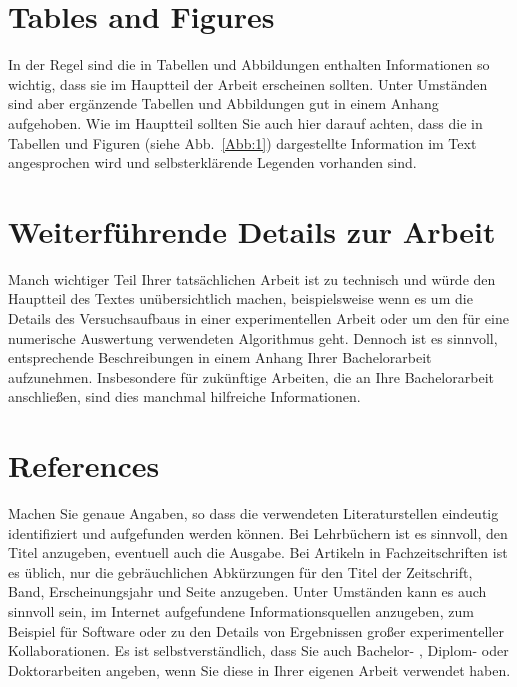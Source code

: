 \documentclass[a4paper,11pt,oneside,final,english,toc=bib]{scrbook}
\begin{document}
\chapter{Tables and Figures}

In der Regel sind die in Tabellen und Abbildungen enthalten Informationen 
so wichtig, dass sie im Hauptteil der Arbeit erscheinen sollten. Unter 
Umständen sind aber ergänzende Tabellen und Abbildungen gut in einem 
Anhang aufgehoben. Wie im Hauptteil sollten Sie auch hier darauf achten, 
dass die in Tabellen und Figuren (siehe Abb.\ \ref{Abb:1}) dargestellte 
Information im Text angesprochen wird und selbsterklärende Legenden 
vorhanden sind.
\medskip



\chapter{Weiterführende Details zur Arbeit}

Manch wichtiger Teil Ihrer tatsächlichen Arbeit ist zu technisch 
und würde den Hauptteil des Textes unübersichtlich machen, 
beispielsweise wenn es um die Details des Versuchsaufbaus in einer 
experimentellen Arbeit oder um den für eine numerische Auswertung 
verwendeten Algorithmus geht. Dennoch ist es sinnvoll, entsprechende 
Beschreibungen in einem Anhang Ihrer Bachelorarbeit aufzunehmen. 
Insbesondere für zukünftige Arbeiten, die an Ihre Bachelorarbeit 
anschlie{\ss}en, sind dies manchmal hilfreiche Informationen.

\chapter{References}

Machen Sie genaue Angaben, so dass die verwendeten Literaturstellen 
eindeutig identifiziert und aufgefunden werden können.
Bei Lehrbüchern \cite{Weinberg:1995mt} ist es sinnvoll, 
den Titel anzugeben, eventuell auch die Ausgabe. Bei Artikeln in 
Fachzeitschriften \cite{Moch:2001zr} ist es üblich, nur die 
gebräuchlichen Abkürzungen für den Titel der Zeitschrift, Band, 
Erscheinungsjahr und Seite anzugeben. Unter Umständen kann es auch 
sinnvoll sein, im Internet aufgefundene Informationsquellen anzugeben, 
zum Beispiel für Software \cite{LoopTools} oder zu den Details von 
Ergebnissen gro{\ss}er experimenteller Kollaborationen. Es ist 
selbstverständlich, dass Sie auch Bachelor- \cite{BA:Freund}, 
Diplom- oder Doktorarbeiten angeben, wenn Sie diese in Ihrer eigenen 
Arbeit verwendet haben.
\medskip
\end{document}
